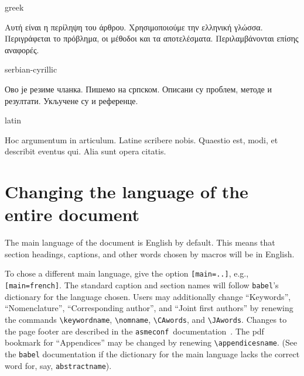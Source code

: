 \documentclass[colorlinks,nofoot,spanish,japanese,russian,greek,ukrainian,vietnamese,french,portuguese,turkish,polish,indonesian,italian,german,latin,serbianc,bidi=basic]{asmeconf}
\newcommand*\AC{{\upshape\texttt{asmeconf}}}
\begin{document}
\begin{selectlanguage}{greek}%
\begin{abstract*}
Αυτή είναι η περίληψη του άρθρου. Χρησιμοποιούμε την ελληνική γλώσσα. Περιγράφεται το πρόβλημα, οι μέθοδοι και τα αποτελέσματα. Περιλαμβάνονται επίσης αναφορές.
\end{abstract*}
\end{selectlanguage}%

\begin{selectlanguage}{serbian-cyrillic}
\begin{abstract*}
Ово је резиме чланка. Пишемо на српском. Описани су проблем, методе и резултати. Укључене су и референце.
\end{abstract*}
\end{selectlanguage}%

{\NotoSerif
\begin{selectlanguage}{latin}
\begin{abstract*}
Hoc argumentum in articulum. Latine scribere nobis. Quaestio est, modi, et describit eventus qui. Alia sunt opera citatis.
\end{abstract*}
\end{selectlanguage}
}%

\section{Changing the language of the entire document}
The main language of the document is English  by default.  This means that section headings, captions, and other words chosen by macros will be in English. 

To chose a different main language, give the option \texttt{[main=..]}, e.g., \texttt{[main=french]}. The standard caption and section names will follow \texttt{babel}'s dictionary for the language chosen.  Users may additionally change ``Keywords'', ``Nomenclature'',  ``Corresponding author'', and ``Joint first authors'' by renewing the commands \verb|\keywordname|, \verb|\nomname|, \verb|\CAwords|, and \verb|\JAwords|. Changes to the page footer are described in the \AC\ documentation~\cite{lienhard2021}. The pdf bookmark for ``Appendices'' may be changed by renewing \verb|\appendicesname|. (See the \texttt{babel} documentation \cite[\S 1.15]{bezos2020} if the dictionary for the main language lacks the correct word for, say, \verb|abstractname|).
\end{document}
